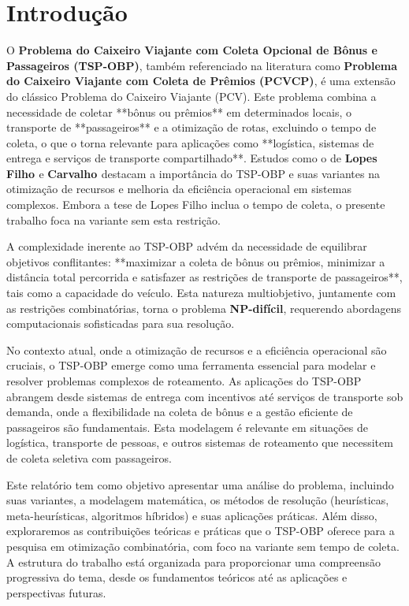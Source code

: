 \documentclass[12pt, a4paper]{report}
\begin{document}

\newpage
\tableofcontents
\thispagestyle{empty}

\newpage
\setcounter{page}{1}
\pagestyle{plain}

\section*{Introdução}

O \textbf{Problema do Caixeiro Viajante com Coleta Opcional de Bônus e Passageiros (TSP-OBP)}, também referenciado na literatura como \textbf{Problema do Caixeiro Viajante com Coleta de Prêmios (PCVCP)}, é uma extensão do clássico Problema do Caixeiro Viajante (PCV). Este problema combina a necessidade de coletar **bônus ou prêmios** em determinados locais, o transporte de **passageiros** e a otimização de rotas, excluindo o tempo de coleta, o que o torna relevante para aplicações como **logística, sistemas de entrega e serviços de transporte compartilhado**. Estudos como o de \textbf{Lopes Filho \cite{lopesfilho2019}} e \textbf{Carvalho \cite{carvalho2022}} destacam a importância do TSP-OBP e suas variantes na otimização de recursos e melhoria da eficiência operacional em sistemas complexos. Embora a tese de Lopes Filho \cite{lopesfilho2019} inclua o tempo de coleta, o presente trabalho foca na variante sem esta restrição.

A complexidade inerente ao TSP-OBP advém da necessidade de equilibrar objetivos conflitantes: **maximizar a coleta de bônus ou prêmios, minimizar a distância total percorrida e satisfazer as restrições de transporte de passageiros**, tais como a capacidade do veículo. Esta natureza multiobjetivo, juntamente com as restrições combinatórias, torna o problema \textbf{NP-difícil}, requerendo abordagens computacionais sofisticadas para sua resolução.

No contexto atual, onde a otimização de recursos e a eficiência operacional são cruciais, o TSP-OBP emerge como uma ferramenta essencial para modelar e resolver problemas complexos de roteamento. As aplicações do TSP-OBP abrangem desde sistemas de entrega com incentivos até serviços de transporte sob demanda, onde a flexibilidade na coleta de bônus e a gestão eficiente de passageiros são fundamentais. Esta modelagem é relevante em situações de logística, transporte de pessoas,  e outros sistemas de roteamento que necessitem de coleta seletiva com passageiros.

Este relatório tem como objetivo apresentar uma análise do problema, incluindo suas variantes, a modelagem matemática, os métodos de resolução (heurísticas, meta-heurísticas, algoritmos híbridos) e suas aplicações práticas. Além disso, exploraremos as contribuições teóricas e práticas que o TSP-OBP oferece para a pesquisa em otimização combinatória, com foco na variante sem tempo de coleta. A estrutura do trabalho está organizada para proporcionar uma compreensão progressiva do tema, desde os fundamentos teóricos até as aplicações e perspectivas futuras.
\end{document}
